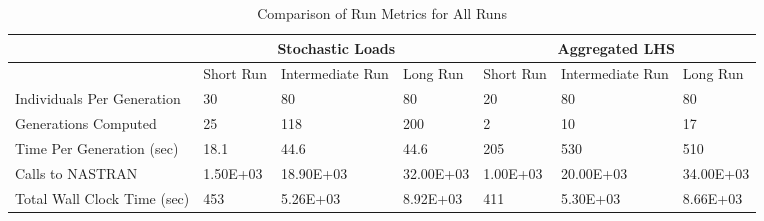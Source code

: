 \begin{table}[!htbp]
\caption{Comparison of Run Metrics for All Runs}
\label{tab:metrics}
\begin{center}
\footnotesize
\begin{tabular}{|l|l|l|l||l|l|l|}
\hline
                            & \multicolumn{3}{|c||}{Stochastic Loads}     & \multicolumn{3}{|c|}{Aggregated LHS}       \\
\hline
                            & Short Run & Intermediate Run & Long Run  & Short Run & Intermediate Run & Long Run  \\
\hline
Individuals Per Generation  & 30        & 80               & 80        & 20        & 80               & 80        \\
Generations Computed        & 25        & 118              & 200       & 2         & 10               & 17        \\
Time Per Generation (sec)   & 18.1      & 44.6             & 44.6      & 205       & 530              & 510       \\
Calls to NASTRAN            & 1.50E+03  & 18.90E+03        & 32.00E+03 & 1.00E+03  & 20.00E+03        & 34.00E+03 \\
Total Wall Clock Time (sec) & 453       & 5.26E+03         & 8.92E+03  & 411       & 5.30E+03         & 8.66E+03  \\
\hline 
\end{tabular}
\end{center}
\end{table}
